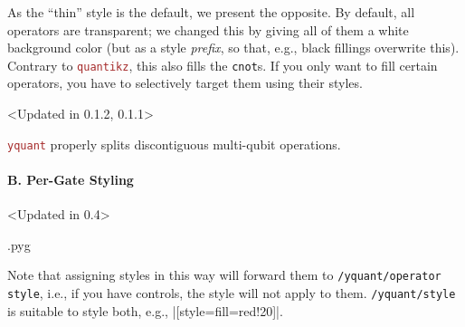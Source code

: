 \documentclass{scrartcl}
\makeatletter
\newenvironment{codeexample}{%
   \VerbatimEnvironment%
   \let\FVB@VerbatimOut\minted@FVB@VerbatimOut
   \let\FVE@VerbatimOut\minted@FVE@VerbatimOut
   \minted@configlang{tex}%
   \minted@fvset
   \begin{VerbatimOut}[codes={\catcode`\^^I=12},firstline,lastline]{\minted@jobname.pyg}%
}{
   \end{VerbatimOut}%
   \minted@langlinenoson%
   \savebox\codeexamplebox{ \minted@jobname.pyg}%
   \ifdim\wd\codeexamplebox>\dimexpr.5\linewidth-3mm\relax%
      \wd\codeexamplebox=.5\linewidth%
   \else%
      \wd\codeexamplebox=\dimexpr\wd\codeexamplebox+3mm\relax%
   \fi%
   \noindent\begin{minipage}{\wd\codeexamplebox}%
      \centering%
      \usebox\codeexamplebox%
   \end{minipage}%
   \begin{minipage}{\dimexpr\linewidth-\wd\codeexamplebox\relax}%
      \expandafter\minted@pygmentize\expandafter{\minted@lang}%
   \end{minipage}%
   \minted@langlinenosoff%
   \par%
}
\newenvironment{codeexample*}{%
   \VerbatimEnvironment%
   \let\FVB@VerbatimOut\minted@FVB@VerbatimOut
   \let\FVE@VerbatimOut\minted@FVE@VerbatimOut
   \minted@configlang{tex}%
   \minted@fvset
   \begin{VerbatimOut}[codes={\catcode`\^^I=12},firstline,lastline]{\minted@jobname.pyg}%
}{
   \end{VerbatimOut}%
   \minted@langlinenoson%
   \begin{adjustbox}{center}
       \minted@jobname.pyg %
   \end{adjustbox}\nopagebreak
   \expandafter\minted@pygmentize\expandafter{\minted@lang}%
   \minted@langlinenosoff%
   \par%
}
\def\pkg#1{\textcolor{brown}{\texttt{#1}}}
\def\ttlink{\link\texttt}
\def\Yquant{\pkg{yquant}}
\makeatother
\begin{document}
               \begin{example}
                  \begin{codeexample*}
                  \end{codeexample*}
                  As the ``thin'' style is the default, we present the opposite.
                  By default, all operators are transparent; we changed this by giving all of them a white background color (but as a style \emph{prefix}, so that, e.g., black fillings overwrite this).
                  Contrary to \pkg{quantikz}, this also fills the \ttlink{cnot}s.
                  If you only want to fill certain operators, you have to selectively target them using their styles.
               \end{example}

               \begin{example}<Updated in 0.1.2, 0.1.1>
                  \begin{codeexample*}
                  \end{codeexample*}
                  \Yquant{} properly splits discontiguous multi\hyp qubit operations.
               \end{example}

            \paragraph{B. Per-Gate Styling}\leavevmode
               \begin{example}<Updated in 0.4>
                  \begin{codeexample}
                  \end{codeexample}
                  Note that assigning styles in this way will forward them to \ttlink{/yquant/operator style}, i.e., if you have controls, the style will not apply to them.
                  \ttlink{/yquant/style} is suitable to style both, e.g., \tex|[style={fill=red!20}]|.
               \end{example}
\end{document}
